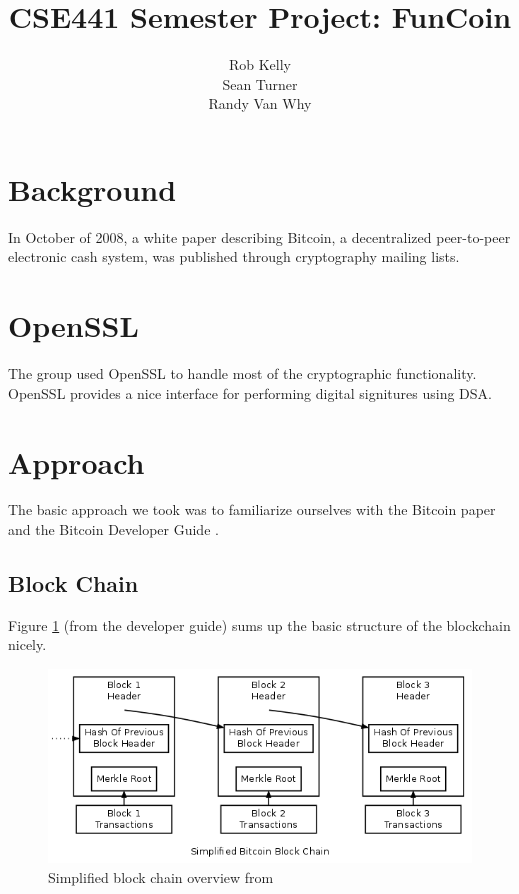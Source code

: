 \documentclass[12pt]{article}
\begin{document}
\title{CSE441 Semester Project: FunCoin}
\author{Rob Kelly\\Sean Turner\\Randy Van Why}
\maketitle

\section{Background}
In October of 2008, a white paper\cite{nakamoto:bitcoin} describing Bitcoin, a decentralized peer-to-peer electronic cash system, was published through cryptography mailing lists.

\section{OpenSSL}
The group used OpenSSL to handle most of the cryptographic functionality. OpenSSL provides a nice interface for performing digital signitures using DSA.

\section{Approach}\label{approach}
The basic approach we took was to familiarize ourselves with the Bitcoin paper\cite{nakamoto:bitcoin} and the Bitcoin Developer Guide \cite{dev:guide}. 

\subsection{Block Chain}\label{blockchain}
Figure \ref{figblockchain} (from the developer guide) sums up the basic structure of the blockchain nicely. 

\begin{figure}[h!]\label{figblockchain}
	\centering
	\includegraphics[scale=0.5]{en-blockchain-overview.png}
	\caption{Simplified block chain overview from \cite{dev:guide}}
\end{figure}
\end{document}
